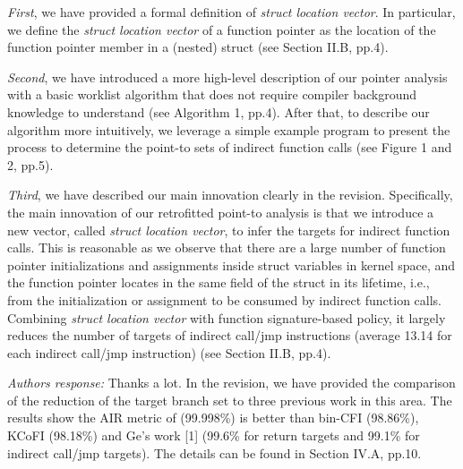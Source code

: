 \documentclass[oneside, 11pt]{article}
\begin{document}
\emph{First}, we have provided a formal definition of \emph{struct location vector}.
In particular, we define the \emph{struct location vector} of a function pointer
as the location of the function pointer member in a (nested) struct (see Section II.B, pp.4).

\emph{Second}, we have introduced a more high-level description of our pointer
analysis with a basic worklist algorithm that does not require compiler
background knowledge to understand (see Algorithm 1, pp.4).
After that, to describe our algorithm more intuitively, we leverage a simple
example program to present the process to determine the point-to sets of
indirect function calls (see Figure 1 and 2, pp.5).

\emph{Third}, we have described our main innovation clearly in the revision.
Specifically, the main innovation of our retrofitted point-to analysis is that
we introduce a new vector, called \emph{struct location vector}, to infer the
targets for indirect function calls. This is reasonable as we observe that
there are a large number of function pointer initializations and assignments inside
struct variables in kernel space, and the function pointer locates in the
same field of the struct in its lifetime, i.e., from the initialization or assignment to
be consumed by indirect function calls. Combining \emph{struct location vector}
with function signature-based policy, it largely reduces the number of targets
of indirect call/jmp instructions (average 13.14 for each indirect call/jmp
instruction) (see Section II.B, pp.4).


\smallskip
\smallskip
\smallskip
{}

{\em Authors response:}
Thanks a lot. In the revision, we have provided the comparison of the
reduction of the target branch set to three previous work in this area.
The results show the AIR metric of \TheName{} (99.998\%) is better than
bin-CFI (98.86\%), KCoFI (98.18\%) and Ge's work [1] (99.6\% for return targets and
99.1\% for indirect call/jmp targets).
The details can be found in Section IV.A, pp.10.
\end{document}
